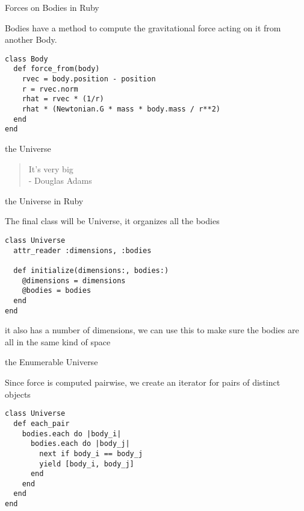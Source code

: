 \documentclass[bigger]{beamer}
\begin{document}
\begin{frame}[fragile,label=sec-26]{Forces on Bodies in Ruby}
 \begin{block}{Bodies have a method to compute the gravitational force acting on it from another Body.}
\begin{verbatim}
class Body
  def force_from(body)
    rvec = body.position - position
    r = rvec.norm
    rhat = rvec * (1/r)
    rhat * (Newtonian.G * mass * body.mass / r**2)
  end
end
\end{verbatim}
\end{block}
\end{frame}
\begin{frame}[label=sec-27]{the Universe}
\begin{quote}
It's very big \\
- Douglas Adams
\end{quote}
\end{frame}

\begin{frame}[fragile,label=sec-28]{the Universe in Ruby}
 \begin{block}{The final class will be Universe, it organizes all the bodies}
\begin{verbatim}
class Universe
  attr_reader :dimensions, :bodies

  def initialize(dimensions:, bodies:)
    @dimensions = dimensions
    @bodies = bodies
  end
end
\end{verbatim}
\end{block}

\begin{block}{it also has a number of \alert{\alert{dimensions}}, we can use this to make sure the bodies are all in the same kind of space}
\end{block}
\end{frame}

\begin{frame}[fragile,label=sec-29]{the Enumerable Universe}
 \begin{block}{Since force is computed pairwise, we create an \alert{\alert{iterator for pairs of distinct objects}}}
\begin{verbatim}
class Universe
  def each_pair
    bodies.each do |body_i|
      bodies.each do |body_j|
        next if body_i == body_j
        yield [body_i, body_j]
      end
    end
  end
end
\end{verbatim}
\end{block}
\end{frame}
\end{document}

